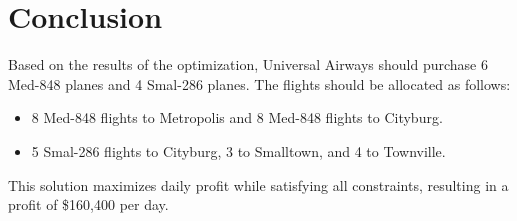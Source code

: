 \documentclass{article}
\begin{document}
\section*{Conclusion}
Based on the results of the optimization, Universal Airways should purchase 6 Med-848 planes and 4 Smal-286 planes. The flights should be allocated as follows:
\begin{itemize}
    \item 8 Med-848 flights to Metropolis and 8 Med-848 flights to Cityburg.
    \item 5 Smal-286 flights to Cityburg, 3 to Smalltown, and 4 to Townville.
\end{itemize}
This solution maximizes daily profit while satisfying all constraints, resulting in a profit of \$160,400 per day.
\end{document}
